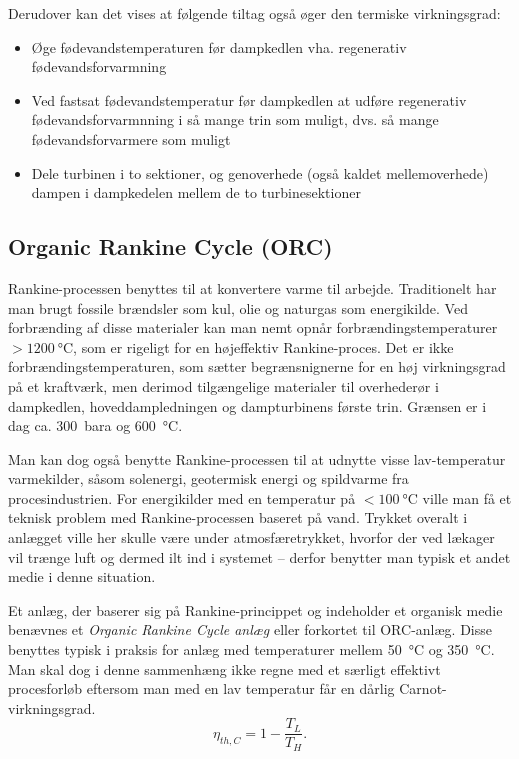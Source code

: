 Derudover kan det vises at følgende tiltag også øger den termiske virkningsgrad:
\begin{itemize}
  \item Øge fødevandstemperaturen før dampkedlen vha. regenerativ fødevandsforvarmning
  \item Ved fastsat fødevandstemperatur før dampkedlen at udføre regenerativ fødevandsforvarmnning i så mange trin som muligt, dvs. så mange fødevandsforvarmere som muligt
  \item Dele turbinen i to sektioner, og genoverhede (også kaldet mellemoverhede) dampen i dampkedelen mellem de to turbinesektioner
\end{itemize}

\subsection{Organic Rankine Cycle (ORC)}
Rankine-processen benyttes til at konvertere varme til arbejde. Traditionelt har man brugt fossile brændsler som kul, olie og naturgas som energikilde. Ved forbrænding af disse materialer kan man nemt opnår forbrændingstemperaturer $> \qty{1200}{\celsius}$, som er rigeligt for en højeffektiv Rankine-proces. Det er ikke forbrændingstemperaturen, som sætter begrænsnignerne for en høj virkningsgrad på et kraftværk, men derimod tilgængelige materialer til overhederør i dampkedlen, hoveddampledningen og dampturbinens første trin. Grænsen er i dag ca. \qty{300}{bara} og \qty{600}{\celsius}.

Man kan dog også benytte Rankine-processen til at udnytte visse lav-temperatur varmekilder, såsom solenergi, geotermisk energi og spildvarme fra procesindustrien. For energikilder med en temperatur på $< \qty{100}{\celsius}$ ville man få et teknisk problem med Rankine-processen baseret på vand. Trykket overalt i anlægget ville her skulle være under atmosfæretrykket, hvorfor der ved lækager vil trænge luft og dermed ilt ind i systemet -- derfor benytter man typisk et andet medie i denne situation.

Et anlæg, der baserer sig på Rankine-princippet og indeholder et organisk medie benævnes et \textit{Organic Rankine Cycle anlæg} eller forkortet til ORC-anlæg. Disse benyttes typisk i praksis for anlæg med temperaturer mellem \qty{50}{\celsius} og \qty{350}{\celsius}. Man skal dog i denne sammenhæng ikke regne med et særligt effektivt procesforløb eftersom man med en lav temperatur får en dårlig Carnot-virkningsgrad.
\[ 
\eta_{th, C} = 1 - \frac{T_L}{T_H}
.\]

